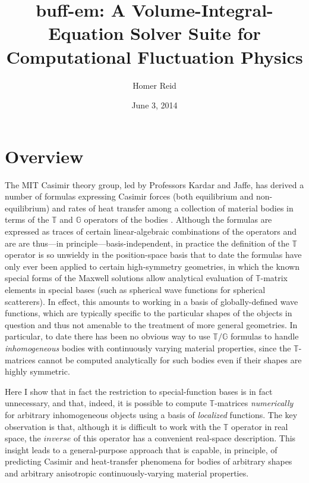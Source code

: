 \documentclass[letterpaper]{article}
\title { {\sc buff-em}: A Volume-Integral-Equation
         Solver Suite for Computational Fluctuation Physics}
\author {Homer Reid}
\date {June 3, 2014}
\newcommand{\TT}{\mathbb{T}}
\newcommand{\GG}{\mathbb{G}}
\begin{document}
\pagestyle{myheadings}
\maketitle

\tableofcontents

\newpage
\section{Overview}
\label{OverviewSection}

The MIT Casimir theory group, led by Professors Kardar and 
Jaffe, has derived a number of formulas expressing
Casimir forces (both equilibrium and non-equilibrium) and
rates of heat transfer among a collection of material bodies 
in terms of the $\TT$ and $\GG$ operators of the bodies
\cite{Rahi2009, Kruger2012}.
Although the formulas are expressed as traces of 
certain linear-algebraic combinations of the operators 
and are are thus---in principle---basis-independent, in 
practice the definition of the $\mathbb{T}$ operator is so
unwieldy in the position-space basis that to date the formulas 
have only ever been applied to certain high-symmetry geometries, 
in which the known special forms of the Maxwell solutions allow
analytical evaluation of $\mathbb{T}$-matrix elements in
special bases (such as spherical wave functions for spherical
scatterers).
In effect, this amounts to working in a basis of globally-defined
wave functions, which are typically specific to the 
particular shapes of the objects in question and thus not 
amenable to the treatment of more general geometries.
In particular, to date there has been no obvious way to use
$\mathbb{T}/\mathbb{G}$ formulas to handle \textit{inhomogeneous}
bodies with continuously varying material properties, since 
the $\mathbb{T}$-matrices cannot be computed analytically
for such bodies even if their shapes are highly symmetric.

Here I show that in fact the restriction to special-function
bases is in fact unnecessary, and that, indeed, it is possible
to compute $\mathbb{T}$-matrices \textit{numerically} for
arbitrary inhomogeneous objects using a basis of \textit{localized}
functions. The key observation is that, although it is difficult 
to work with the $\mathbb{T}$ operator in real space, the
$\textit{inverse}$ of this operator has a convenient real-space
description.
This insight leads to a general-purpose approach
that is capable, in principle, of predicting Casimir and
heat-transfer phenomena for bodies of arbitrary shapes and
arbitrary anisotropic continuously-varying material properties.
\end{document}
